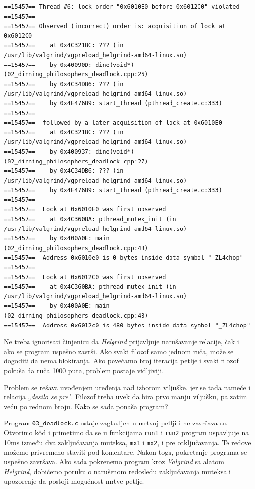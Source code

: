 \begin{verbatim}
==15457== Thread #6: lock order "0x6010E0 before 0x6012C0" violated
==15457==
==15457== Observed (incorrect) order is: acquisition of lock at 0x6012C0
==15457==    at 0x4C321BC: ??? (in /usr/lib/valgrind/vgpreload_helgrind-amd64-linux.so)
==15457==    by 0x40090D: dine(void*) (02_dinning_philosophers_deadlock.cpp:26)
==15457==    by 0x4C34DB6: ??? (in /usr/lib/valgrind/vgpreload_helgrind-amd64-linux.so)
==15457==    by 0x4E476B9: start_thread (pthread_create.c:333)
==15457==
==15457==  followed by a later acquisition of lock at 0x6010E0
==15457==    at 0x4C321BC: ??? (in /usr/lib/valgrind/vgpreload_helgrind-amd64-linux.so)
==15457==    by 0x400937: dine(void*) (02_dinning_philosophers_deadlock.cpp:27)
==15457==    by 0x4C34DB6: ??? (in /usr/lib/valgrind/vgpreload_helgrind-amd64-linux.so)
==15457==    by 0x4E476B9: start_thread (pthread_create.c:333)
==15457==
==15457==  Lock at 0x6010E0 was first observed
==15457==    at 0x4C360BA: pthread_mutex_init (in /usr/lib/valgrind/vgpreload_helgrind-amd64-linux.so)
==15457==    by 0x400A0E: main (02_dinning_philosophers_deadlock.cpp:48)
==15457==  Address 0x6010e0 is 0 bytes inside data symbol "_ZL4chop"
==15457==
==15457==  Lock at 0x6012C0 was first observed
==15457==    at 0x4C360BA: pthread_mutex_init (in /usr/lib/valgrind/vgpreload_helgrind-amd64-linux.so)
==15457==    by 0x400A0E: main (02_dinning_philosophers_deadlock.cpp:48)
==15457==  Address 0x6012c0 is 480 bytes inside data symbol "_ZL4chop"
\end{verbatim}

Ne treba ignorisati činjenicu da \emph{Helgrind} prijavljuje narušavanje relacije, čak i ako se program uspešno završi. Ako svaki filozof samo jednom ruča, može se dogoditi da nema blokiranja. Ako povećamo broj iteracija petlje i svaki filozof pokuša da ruča 1000 puta, problem postaje vidljiviji.

Problem se rešava uvođenjem uređenja nad izborom viljuške, jer se tada nameće i relacija \emph{„desilo se pre"}. Filozof treba uvek da bira prvo manju viljušku, pa zatim veću po rednom broju. Kako se sada ponaša program?

Program \texttt{03\_deadlock.c} ostaje zaglavljen u mrtvoj petlji i ne završava se. Otvorimo kôd i primetimo da se u funkcijama \texttt{run1} i \texttt{run2} program uspavljuje na 10ms između dva zaključavanja muteksa, \texttt{mx1} i \texttt{mx2}, i pre otključavanja. Te redove možemo privremeno staviti pod komentare. Nakon toga, pokretanje programa se uspešno završava. Ako sada pokrenemo program kroz \emph{Valgrind} sa alatom \emph{Helgrind}, dobićemo poruku o narušenom redosledu zaključavanja muteksa i upozorenje da postoji mogućnost mrtve petlje.
